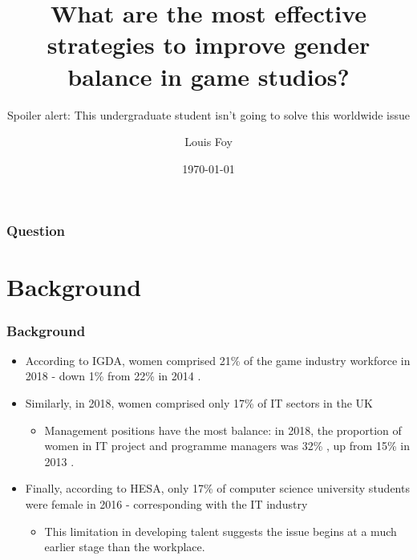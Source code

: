 \documentclass{beamer}
\title{What are the most effective strategies to improve gender balance in game studios?}
\subtitle{Spoiler alert: This undergraduate student isn't going to solve this worldwide issue}
\author{Louis Foy}
\institute{Falmouth University}
\date{\today}
\begin{document}
\begin{frame}
	\titlepage
\end{frame}

\begin{frame}
	\frametitle{Question}
	\tableofcontents
\end{frame}

\section{Background}
\begin{frame}
	\frametitle{Background}
	\begin{itemize}
	    \item According to IGDA, women comprised 21\% of the game industry workforce in 2018 \cite{igda_satisfaction_2017} - down 1\% from 22\% in 2014 \cite{igda_satisfaction_2014}.
	    \item Similarly, in 2018, women comprised only 17\% of IT sectors in the UK \cite{uk_employees} %
	    \begin{itemize}
	        \item Management positions have the most balance: in 2018, the proportion of women in IT project and programme managers was 32\% \cite{uk_employees_2018}, up from 15\% in 2013 \cite{uk_employees_2013}.
	    \end{itemize}
	    \item Finally, according to HESA, only 17\% of computer science university students were female in 2016 \cite{hesa_2016} - corresponding with the IT industry
	    \begin{itemize}
	        \item This limitation in developing talent suggests the issue begins at a much earlier stage than the workplace.
	    \end{itemize}
	\end{itemize}
\end{frame}
\end{document}
